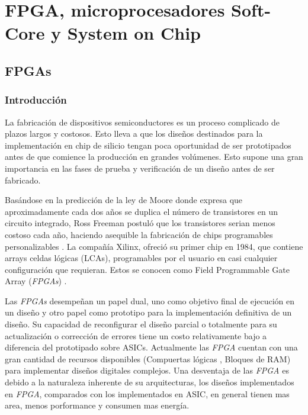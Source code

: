 \chapter{FPGA, microprocesadores Soft-Core y System on Chip}
\section{FPGAs}
	\subsection{Introducción}
	\par
	La fabricación de dispositivos semiconductores es un proceso complicado de plazos largos y costosos. Esto lleva a que los diseños destinados para la 
	implementación en chip de silicio tengan poca oportunidad de ser prototipados antes de que comience la producción en grandes volúmenes. Esto supone
	una gran importancia en las fases de prueba y verificación de un diseño antes de ser fabricado.
	\vspace{0.5cm}
	\par
	Basándose en la predicción de la ley de Moore donde expresa que aproximadamente cada dos años se duplica el número de transistores en un circuito
	integrado\cite{Etiqueta02}, Ross Freeman postuló que los transistores serian menos costoso cada año, haciendo asequible la fabricación de chips
	programables personalizables \cite{Etiqueta03}. La compañía Xilinx, ofreció su primer chip en 1984, que contiene arrays celdas lógicas (LCAs),
	programables por el usuario en casi cualquier configuración que requieran. Estos se conocen como Field Programmable Gate Array (\textit{FPGAs}) .
	\vspace{0.5cm}
	\par
	Las \textit{FPGAs} desempeñan un papel dual, uno como objetivo final de ejecución en un diseño y otro papel como prototipo para la implementación
	definitiva de un diseño. Su capacidad de reconfigurar el diseño parcial o totalmente para su actualización o corrección de errores tiene un costo
	relativamente bajo a diferencia del prototipado sobre ASICs. Actualmente las \textit{FPGA} cuentan con una gran cantidad de recursos disponibles
	(Compuertas lógicas , Bloques de RAM) para implementar diseños digitales complejos. Una desventaja de las \textit{FPGA} es debido a la naturaleza
	inherente de su arquitecturas, los diseños implementados en \textit{FPGA}, comparados con los implementados en ASIC, en general tienen mas area,
	menos porformance y consumen mas energía.
	\vspace{0.5cm}
